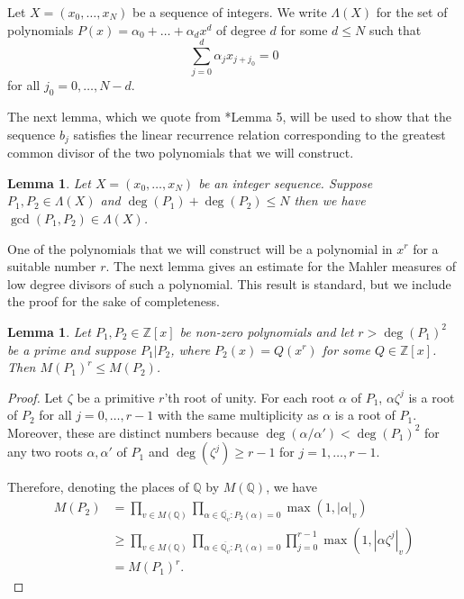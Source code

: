 \documentclass[12pt, notitlepage]{amsart}
\numberwithin{equation}{section}
\def\Q{\mathbb Q}
\def\Z{\mathbb Z}
\def\gcd{\operatorname{gcd}}
\newtheorem{lemma}[theorem]{Lemma}
\theoremstyle{remark}
\theoremstyle{definition}
\theoremstyle{remark}
\numberwithin{equation}{section}
\renewcommand{\a}{\alpha}
\begin{document}
Let $X=(x_0,\ldots,x_N)$ be a sequence of integers.
We write $\Lambda(X)$ for the set of polynomials $P(x)=\a_0+\ldots+\a_d x^d$
of degree $d$ for some $d\le N$ such that
\[
\sum_{j=0}^d \a_j x_{j+j_0}=0
\]
for all $j_0=0,\ldots, N-d$.

The next lemma, which we quote from \cite{Kon}*{Lemma 5}, will be used to show that
the sequence $b_j$ satisfies the linear recurrence relation corresponding
to the greatest common divisor of the two polynomials that we will construct.

\begin{lemma}\label{lm:Konyagin}
Let $X=(x_0,\ldots,x_N)$ be an integer sequence.
Suppose $P_1,P_2\in\Lambda(X)$ and $\deg(P_1)+\deg(P_2)\le N$
then we have $\gcd(P_1,P_2)\in\Lambda(X)$.
\end{lemma}

One of the polynomials that we will construct will be a polynomial in $x^r$
for a suitable number $r$.
The next lemma gives an estimate for the Mahler measures of low degree
divisors of such a polynomial.
This result is standard, but we include the proof for the sake of completeness.

\begin{lemma}\label{lm:Mahler}
Let $P_1,P_2\in\Z[x]$ be non-zero polynomials and let $r>\deg(P_1)^2$ be a prime
and suppose $P_1|P_2$, where $P_2(x)=Q(x^r)$ for some $Q\in\Z[x]$.
Then $M(P_1)^r\le M(P_2)$.
\end{lemma}

\begin{proof}
Let $\zeta$ be a primitive $r$'th root of unity.
For each root $\a$ of $P_1$, $\a\zeta^j$ is a root of $P_2$ for all
$j=0,\ldots,r-1$ with the same multiplicity as $\a$ is a root of $P_1$.
Moreover, these are distinct numbers because $\deg(\a/\a')< \deg(P_1)^2$
for any two roots $\a,\a'$ of $P_1$ and $\deg(\zeta^j)\ge r-1$ for
$j=1,\ldots,r-1$.

Therefore, denoting the places of $\Q$ by $M(\Q)$, we have
\begin{align*}
M(P_2)&=\prod_{v\in M(\Q)}\prod_{\a\in\overline{\Q_v}: P_2(\a)=0} \max(1,|\a|_v)\\
&\ge \prod_{v\in M(\Q)}\prod_{\a\in\overline{\Q_v}:P_1(\a)=0}
\prod_{j=0}^{r-1} \max(1,|\a\zeta^j|_v)\\
&=M(P_1)^r.
\end{align*}
\end{proof}
	
\end{document}
